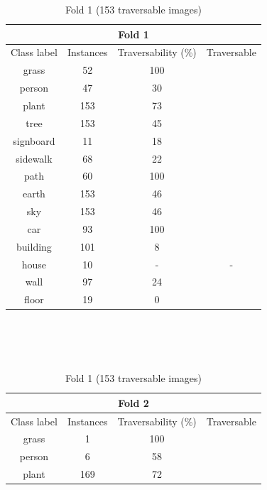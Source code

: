 \documentclass[12pt,a4paper,table,dvipsnames,tikz]{report}
\begin{document}
	\begin{table}[h!]
		\begin{subtable}[h!]{\textwidth}
			\centering
			\begin{tabular}{|c|c|c|c|}
				\hline
				\multicolumn{4}{|c|}{Fold 1}\\
				\hline
				Class label & Instances & Traversability (\%) & Traversable\\
				\hline\hline
				grass & 52 & 100 & \checkmark\\
				\hline
				person & 47 & 30 &\\
				\hline
				\rowcolor{plant}
				plant & 153 & 73 & \checkmark\\
				\hline
				\rowcolor{tree}
				tree & 153 & 45 &\\
				\hline
				signboard & 11 & 18 &\\
				\hline
				sidewalk & 68 & 22 &\\
				\hline
				path & 60 & 100 & \checkmark\\
				\hline
				\rowcolor{earth}
				earth & 153 & 46 &\\
				\hline
				\rowcolor{sky}
				sky & 153 & 46 &\\
				\hline
				car & 93 & 100 & \checkmark\\
				\hline
				\rowcolor{building}
				building & 101 & 8 &\\
				\hline
				\rowcolor{house}
				house & 10 & - & -\\
				\hline
				\rowcolor{wall}
				wall & 97 & 24 &\\
				\hline
				\rowcolor{floor}
				floor & 19 & 0 &\\
				\hline
			\end{tabular}
			\caption{Fold 1 (153 traversable images)}
			\label{table:trav.f1}
		\end{subtable}
		\\\\\\
		\begin{subtable}[h!]{\textwidth}
			\centering
			\begin{tabular}{|c|c|c|c|}
				\hline
				\multicolumn{4}{|c|}{Fold 2}\\
				\hline
				Class label & Instances & Traversability (\%) & Traversable\\
				\hline\hline
				grass & 1 & 100 & \checkmark\\
				\hline
				person & 6 & 58 & \checkmark\\
				\hline
				plant & 169 & 72 & \checkmark\\

\end{tabular}
\end{subtable}
\end{table}
\end{document}
